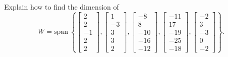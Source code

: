 \documentclass{article}
\begin{document}
\begin{exerciseStatement}
    Explain how to find the dimension of
\[W=\mathrm{span}\ \left\{\left[\begin{array}{r}
2 \\
2 \\
-1 \\
2 \\
2
\end{array}\right] , \left[\begin{array}{r}
1 \\
-3 \\
3 \\
3 \\
2
\end{array}\right] , \left[\begin{array}{r}
-8 \\
8 \\
-10 \\
-16 \\
-12
\end{array}\right] , \left[\begin{array}{r}
-11 \\
17 \\
-19 \\
-25 \\
-18
\end{array}\right] , \left[\begin{array}{r}
-2 \\
3 \\
-3 \\
0 \\
-2
\end{array}\right]\right\}.\]



  
\end{exerciseStatement}
\end{document}
